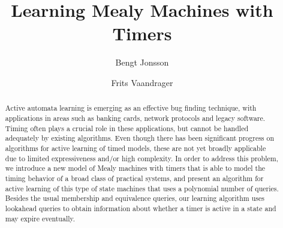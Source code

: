 \documentclass{llncs}
\begin{document}
\title{Learning Mealy Machines with Timers}
\author{
Bengt Jonsson 
\and
Frits Vaandrager 
}

\maketitle

\begin{abstract}
Active automata learning is emerging as an effective bug finding technique, with applications in areas such as banking cards, network protocols and legacy software. Timing often plays a crucial role in these applications, but cannot be handled adequately by existing algorithms. Even though there has been significant progress on algorithms for active learning of timed models, these are not yet broadly applicable due to limited expressiveness and/or high complexity.
In order to address this problem, we introduce a new model of Mealy machines with timers that is able to model the timing behavior of a broad class of practical systems, and present an algorithm for active learning of this type of state machines that uses a
polynomial number of queries. Besides the usual membership and equivalence queries, our learning algorithm uses lookahead queries to obtain information about whether a timer is active in a state and may expire eventually.
\end{abstract}




%

%




\end{document}
